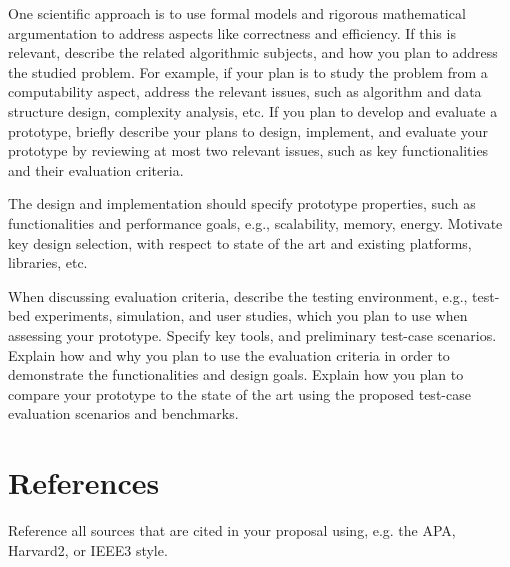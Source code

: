 \documentclass{article}
\begin{document}
One scientific approach is to use formal models and rigorous 
mathematical argumentation to address aspects like correctness and efficiency. If this is relevant, describe the related algorithmic 
subjects, and how you plan to address the studied problem. For example, if your plan is to study the problem from a computability aspect, 
address the relevant issues, such as algorithm and data structure design, complexity analysis, etc.  If you plan to develop and 
evaluate a prototype, briefly describe your plans to design, implement, and evaluate your prototype by reviewing at most two relevant 
issues, such as key functionalities and their evaluation criteria.

The design and implementation should specify prototype properties, 
such as functionalities and performance goals, e.g., scalability, memory, energy. Motivate key design selection, with respect to state 
of the art and existing platforms, libraries, etc.  

When discussing evaluation criteria, describe the testing environment, e.g., test-bed 
experiments, simulation, and user studies, which you plan to use when assessing your prototype. Specify key tools, and preliminary 
test-case scenarios. Explain how and why you plan to use the evaluation criteria in order to demonstrate the functionalities and 
design goals. Explain how you plan to compare your prototype to the state of the art using the proposed test-case evaluation scenarios 
and benchmarks. 



\section{References}



%

%



Reference all sources that are cited in your proposal using, e.g. the APA, Harvard2, or IEEE3 style.
\end{document}
